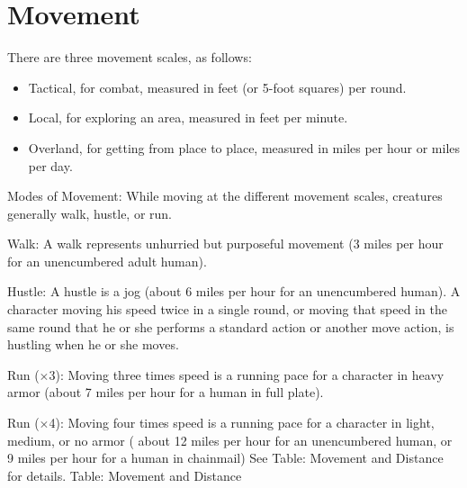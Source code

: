 				
\section{Movement}

				
There are three movement scales, as follows:
				\begin{itemize}\item  Tactical, for combat, measured in feet (or 5-foot squares) per round.
				\item  Local, for exploring an area, measured in feet per minute.
				\item  Overland, for getting from place to place, measured in miles per hour or miles per day.
\end{itemize}
				
Modes of Movement: While moving at the different movement scales, creatures generally walk, hustle, or run.
				
Walk: A walk represents unhurried but purposeful movement (3 miles per hour for an unencumbered adult human).
				
Hustle: A hustle is a jog (about 6 miles per hour for an unencumbered human). A character moving his speed twice in a single round, or moving that speed in the same round that he or she performs a standard action or another move action, is hustling when he or she moves.
				
Run (\mbox{$\times$}3): Moving three times speed is a running pace for a character in heavy armor (about 7 miles per hour for a human in full plate).
				
Run (\mbox{$\times$}4): Moving four times speed is a running pace for a character in light, medium, or no armor ( about 12 miles per hour for an unencumbered human, or 9 miles per hour for a human in chainmail) See Table: Movement and Distance for details.
				Table: Movement and Distance

